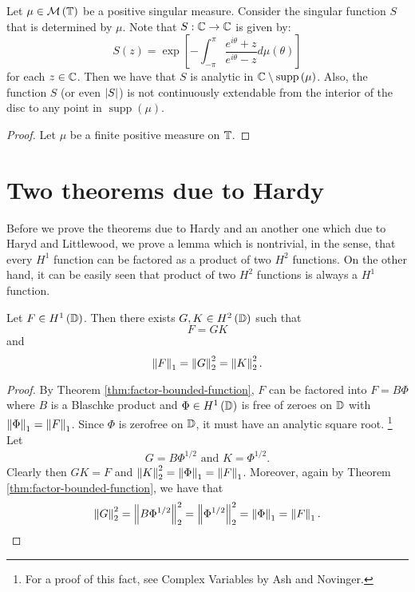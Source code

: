\begin{theorem}
    Let $\mu \in {\cal M} \left( \mathbb T \right)$ be a positive singular measure. Consider the singular function $S$ that is determined by $\mu$. Note that $S : \mathbb C \to \mathbb C$ is given by:
    \begin{equation*}
	S\left( z \right) = \exp \left[ -\int_{-\pi}^{\pi} \frac{e^{i\theta} + z}{e^{i\theta} - z} d\mu \left( \theta \right) \right]
    \end{equation*}
    for each $z\in \mathbb C$. Then we have that $S$ is analytic in $\mathbb C \setminus \operatorname{supp} \left( \mu \right)$. Also, the function $S$ (or even $\left\lvert S \right\rvert$) is not continuously extendable from the interior of the disc to any point in $\operatorname{supp} \left( \mu \right)$.
    \label{thm:analyticity-of-singular-functions}
\end{theorem}
\begin{proof}
    Let $\mu$ be a finite positive measure on $\mathbb T$.
\end{proof}


\section{Two theorems due to Hardy}
Before we prove the theorems due to Hardy and an another one which due to Haryd and Littlewood, we prove a lemma which is nontrivial, in the sense, that every $H^{1}$ function can be factored as a product of two $H^{2}$ functions. On the other hand, it can be easily seen that product of two $H^{2}$ functions is always a $H^{1}$ function.

\begin{theorem}
    Let $F \in H^{1} \left( \mathbb D \right)$. Then there exists $G, K \in H^{2} \left( \mathbb D \right)$ such that
    \begin{equation*}
	F=GK
    \end{equation*}
    and
    \begin{equation*}
	\left\lVert F \right\rVert_{1} = \left\lVert G \right\rVert_{2} ^{2} = \left\lVert K \right\rVert_{2} ^{2}.
    \end{equation*}
    \label{lem:h1-factored-h2}
\end{theorem}
\begin{proof}
    By Theorem \ref{thm:factor-bounded-function}, $F$ can be factored into $F=B \Phi$ where $B$ is a Blaschke product and $\Phi \in H^{1} \left( \mathbb D \right)$ is free of zeroes on $\mathbb D$ with $\left\lVert \Phi \right\rVert_{1} = \left\lVert F \right\rVert_{1}$. Since $\Phi$ is zerofree on $\mathbb D$, it must have an analytic square root. \footnote{For a proof of this fact, see Complex Variables by Ash and Novinger.} Let 
    \begin{align*}
	G=B\Phi ^{1/2} \text{ and } K= \Phi ^{1/2}.
    \end{align*}
    Clearly then $GK=F$ and $\left\lVert K \right\rVert_{2}^{2} = \left\lVert \Phi \right\rVert_{1} = \left\lVert F \right\rVert_{1}$. Moreover, again by Theorem \ref{thm:factor-bounded-function}, we have that
    \begin{equation*}
	\left\lVert G \right\rVert_{2}^{2} = \left\lVert B\Phi ^{1/2} \right\rVert_{2} ^{2} = \left\lVert \Phi ^{1/2} \right\rVert_{2}^{2} = \left\lVert \Phi \right\rVert_{1} = \left\lVert F \right\rVert_{1}.
    \end{equation*}
\end{proof}

